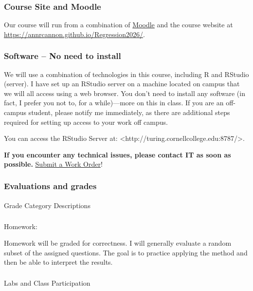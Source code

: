 \documentclass[
  letterpaper,
  DIV=11,
  numbers=noendperiod]{scrartcl}
\makeatletter
\let\oldparagraph\paragraph
\renewcommand{\paragraph}{
    \@ifstar
      \xxxParagraphStar
      \xxxParagraphNoStar
  }
\newcommand{\xxxParagraphStar}[1]{\oldparagraph*{#1}\mbox{}}
\newcommand{\xxxParagraphNoStar}[1]{\oldparagraph{#1}\mbox{}}
\let\oldsubparagraph\subparagraph
\renewcommand{\subparagraph}{
    \@ifstar
      \xxxSubParagraphStar
      \xxxSubParagraphNoStar
  }
\newcommand{\xxxSubParagraphStar}[1]{\oldsubparagraph*{#1}\mbox{}}
\newcommand{\xxxSubParagraphNoStar}[1]{\oldsubparagraph{#1}\mbox{}}
\makeatother
\begin{document}
\subsubsection{Course Site and Moodle}\label{course-site-and-moodle}

Our course will run from a combination of
\href{https://moodle.cornellcollege.edu/course/view.php?id=9632}{Moodle}
and the course website at
\url{https://annrcannon.github.io/Regression2026/}.

\subsubsection{Software -- No need to
install}\label{software-no-need-to-install}

We will use a combination of technologies in this course, including R
and RStudio (server). I have set up an RStudio server on a machine
located on campus that we will all access using a web browser. You don't
need to install any software (in fact, I prefer you not to, for a
while)---more on this in class. If you are an off-campus student, please
notify me immediately, as there are additional steps required for
setting up access to your work off campus.

You can access the RStudio Server at:
\textless{}http://turing.cornellcollege.edu:8787/\textgreater.

\textbf{If you encounter any technical issues, please contact IT as soon
as possible. }
\href{https://www.cornellcollege.edu/information-technology/index.shtml}{Submit
a Work Order}!

\subsubsection{Evaluations and grades}\label{evaluations-and-grades}

\paragraph{Grade Category
Descriptions}\label{grade-category-descriptions}

\subparagraph{Homework:}\label{homework}

Homework will be graded for correctness. I will generally evaluate a
random subset of the assigned questions. The goal is to practice
applying the method and then be able to interpret the results.

\subparagraph{Labs and Class
Participation}\label{labs-and-class-participation}
\end{document}
